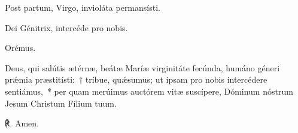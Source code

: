 
\noindent \vv Post partum, Virgo, invioláta permansísti.

\noindent \rr Dei Génitrix, intercéde pro nobis.

Orémus.

\noindent Deus, qui salútis ætérnæ, beátæ Maríæ virginitáte fecúnda, humáno géneri prǽmia præstitísti:~† tríbue, quǽsumus; ut ipsam pro nobis intercédere sentiámus,~* per quam merúimus auctórem vitæ suscípere, Dóminum nóstrum Jesum Christum Fílium tuum. 

℟. Amen.